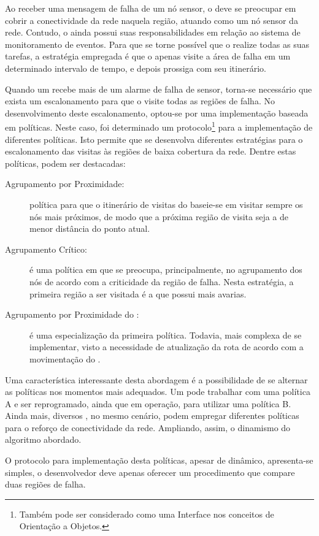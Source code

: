 Ao receber uma mensagem de falha de um nó sensor, o \vant deve se preocupar em cobrir a conectividade da rede naquela região, atuando como um nó sensor da rede. Contudo, o \vant ainda possui suas responsabilidades em relação ao sistema de monitoramento de eventos. Para que se torne possível que o \vant realize todas as suas tarefas, a estratégia empregada é que o \vant apenas visite a área de falha em um determinado intervalo de tempo, e depois prossiga com seu itinerário.

Quando um \vant recebe mais de um alarme de falha de sensor, torna-se necessário que exista um escalonamento para que o \vant visite todas as regiões de falha. No desenvolvimento deste escalonamento, optou-se por uma implementação baseada em políticas. Neste caso, foi determinado um protocolo\footnote{Também pode ser considerado como uma Interface nos conceitos de Orientação a Objetos.} para a implementação de diferentes políticas. Isto permite que se desenvolva diferentes estratégias para o escalonamento das visitas às regiões de baixa cobertura da rede. Dentre estas políticas, podem ser destacadas:

\begin{description}
	\item[Agrupamento por Proximidade:] política para que o itinerário de visitas do \vant baseie-se em visitar sempre os nós mais próximos, de modo que a próxima região de visita seja a de menor distância do ponto atual.
	\item[Agrupamento Crítico:] é uma política em que se preocupa, principalmente, no agrupamento dos nós de acordo com a criticidade da região de falha. Nesta estratégia, a primeira região a ser visitada é a que possui mais avarias.
	\item[Agrupamento por Proximidade do \vant:] é uma especialização da primeira política. Todavia, mais complexa de se implementar, visto a necessidade de atualização da rota de acordo com a movimentação do \vant.
\end{description}

Uma característica interessante desta abordagem é a possibilidade de se alternar as políticas nos momentos mais adequados. Um \vant pode trabalhar com uma política A e ser reprogramado, ainda que em operação, para utilizar uma política B. Ainda mais, diversos \vants, no mesmo cenário, podem empregar diferentes políticas para o reforço de conectividade da rede. Ampliando, assim, o dinamismo do algoritmo abordado.

O protocolo para implementação desta políticas, apesar de dinâmico, apresenta-se simples, o desenvolvedor deve apenas oferecer um procedimento que compare duas regiões de falha.

